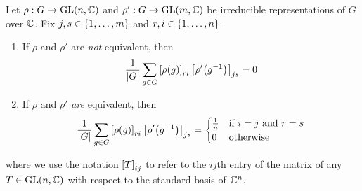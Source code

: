 \begin{lemma}\label{Ch2:Lem:Pre_Ortho_Thm_Sums}
    Let $\rho : G \to \operatorname{GL}\!\left( n, \mathbb{C} \right)$ and $\rho' : G \to \operatorname{GL}\!\left( m, \mathbb{C} \right)$ be irreducible representations of $G$ over $\mathbb{C}$. Fix $j, s \in \left\{ 1, \ldots, m \right\}$ and $r, i \in \left\{ 1, \ldots, n \right\}$.
    \begin{enumerate}[label = \normalfont \arabic*., noitemsep]
        \item If $\rho$ and $\rho'$ are \textit{not} equivalent, then
        \begin{align*}
            \frac{1}{\left\lvert G \right\rvert} \sum_{g \in G} \left[ \rho(g) \right]_{ri} \left[ \rho'\!\left( g^{-1} \right) \right]_{js} = 0
        \end{align*}

        \item If $\rho$ and $\rho'$ \textit{are} equivalent, then
        \begin{align*}
            \frac{1}{\left\lvert G \right\rvert} \sum_{g \in G} \left[ \rho(g) \right]_{ri} \left[ \rho'\!\left( g^{-1} \right) \right]_{js} =
            \begin{cases}
                \frac{1}{n} & \text{if } i = j \text{ and } r = s \\
                0 & \text{otherwise}
            \end{cases}
        \end{align*}
    \end{enumerate}
    where we use the notation $\left[ T \right]_{ij}$ to refer to the $ij$th entry of the matrix of any $T \in \operatorname{GL}\!\left( n, \mathbb{C} \right)$ with respect to the standard basis of $\mathbb{C}^n$.
\end{lemma}

